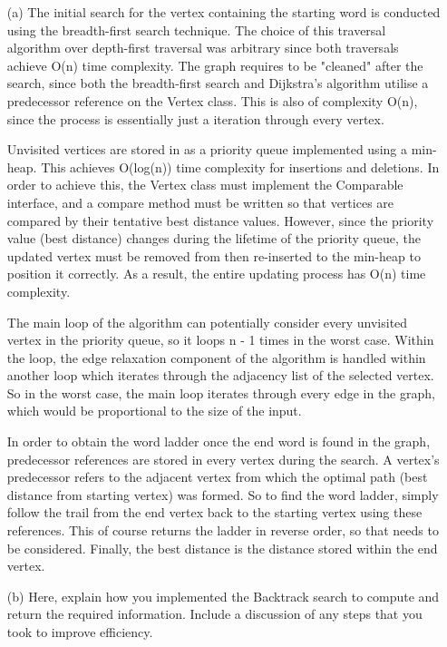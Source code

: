 \documentclass{article}
\begin{document}
\begin{itemize}
    \item[(a)]
    The initial search for the vertex containing the starting word is conducted using the breadth-first search technique. The choice of this traversal algorithm over depth-first traversal was arbitrary since both traversals achieve O(n) time complexity. The graph requires to be "cleaned" after the search, since both the breadth-first search and Dijkstra's algorithm utilise a predecessor reference on the Vertex class. This is also of complexity O(n), since the process is essentially just a iteration through every vertex.

    Unvisited vertices are stored in as a priority queue implemented using a min-heap. This achieves O(log(n)) time complexity for insertions and deletions. In order to achieve this, the Vertex class must implement the Comparable interface, and a compare method must be written so that vertices are compared by their tentative best distance values. However, since the priority value (best distance) changes during the lifetime of the priority queue, the updated vertex must be removed from then re-inserted to the min-heap to position it correctly. As a result, the entire updating process has O(n) time complexity.

    The main loop of the algorithm can potentially consider every unvisited vertex in the priority queue, so it loops n - 1 times in the worst case. Within the loop, the edge relaxation component of the algorithm is handled within another loop which iterates through the adjacency list of the selected vertex. So in the worst case, the main loop iterates through every edge in the graph, which would be proportional to the size of the input.

    In order to obtain the word ladder once the end word is found in the graph, predecessor references are stored in every vertex during the search. A vertex's predecessor refers to the adjacent vertex from which the optimal path (best distance from starting vertex) was formed. So to find the word ladder, simply follow the trail from the end vertex back to the starting vertex using these references. This of course returns the ladder in reverse order, so that needs to be considered. Finally, the best distance is the distance stored within the end vertex.

    \item[(b)]
    Here, explain how you implemented the Backtrack search to compute and return the required information. Include a discussion of any steps that you took to improve efficiency.
\end{itemize}
\end{document}
